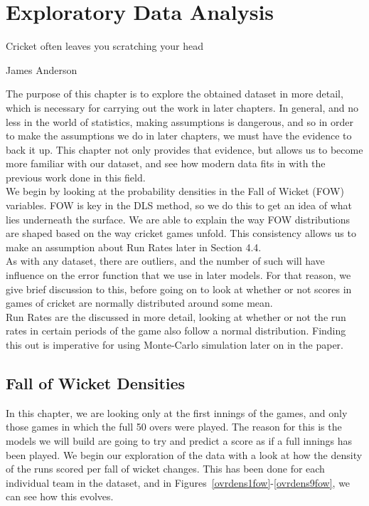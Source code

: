 \chapter{Exploratory Data Analysis}

\epigraph{Cricket often leaves you scratching your head}{James Anderson}

The purpose of this chapter is to explore the obtained dataset in more detail, which is necessary for carrying out the work in later chapters. In general, and no less
in the world of statistics, making assumptions is dangerous, and so in order to make the assumptions we do in later chapters, we must have the evidence to back it up.
This chapter not only provides that evidence, but allows us to become more familiar with our dataset, and see how modern data fits in with the previous work done in this 
field. \\
We begin by looking at the probability densities in the Fall of Wicket (FOW) variables. FOW is key in the DLS method, so we do this to get an idea of what lies underneath the
surface. We are able to explain the way FOW distributions are shaped based on the way cricket games unfold. This consistency allows us to make an assumption about Run Rates
later in Section 4.4. \\
As with any dataset, there are outliers, and the number of such will have influence on the error function that we use in later models. For that reason, we give brief discussion 
to this, before going on to look at whether or not scores in games of cricket are normally distributed around some mean. \\
Run Rates are the discussed in more detail, looking at whether or not the run rates in certain periods of the game also follow a normal distribution. Finding this out is imperative
for using Monte-Carlo simulation later on in the paper.

\section{Fall of Wicket Densities}

In this chapter, we are looking only at the first innings of the games, and only those games in which the full 50 overs were played. The 
reason for this is the models we will build are going to try and predict a score as if a full innings has been played. We begin our exploration of the data with a look at how the density of the runs scored per fall of wicket changes. This has been done for each
individual team in the dataset, and in Figures~\ref{ovrdens1fow}-\ref{ovrdens9fow}, we can see how this evolves.  

